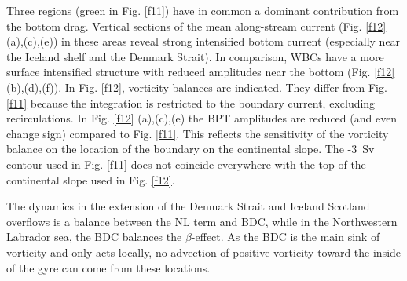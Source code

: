 \documentclass[os, manuscript]{copernicus}
\begin{document}
Three regions (green in Fig. \ref{f11}) have in common a dominant contribution from the bottom drag. Vertical sections of the mean along-stream current (Fig. \ref{f12} (a),(c),(e)) in these areas reveal strong intensified bottom current (especially near the Iceland shelf and the Denmark Strait). In comparison, WBCs have a more surface intensified structure with reduced amplitudes near the bottom (Fig. \ref{f12} (b),(d),(f)). In Fig. \ref{f12}, vorticity balances are indicated. They differ from Fig. \ref{f11} because the integration is restricted to the boundary current, excluding recirculations. In Fig. \ref{f12} (a),(c),(e) the BPT amplitudes are reduced (and even change sign) compared to Fig. \ref{f11}. This reflects the sensitivity of the vorticity balance on the location of the boundary on the continental slope. The -3~Sv contour used in Fig. \ref{f11} does not coincide everywhere with the top of the continental slope used in Fig. \ref{f12}. 

The dynamics in the extension of the Denmark Strait and Iceland Scotland overflows is a balance between the NL term and BDC, while in the Northwestern Labrador sea, the BDC balances the $\beta$-effect. As the BDC is the main sink of vorticity and only acts locally, no advection of positive vorticity toward the inside of the gyre can come from these locations.
\end{document}
